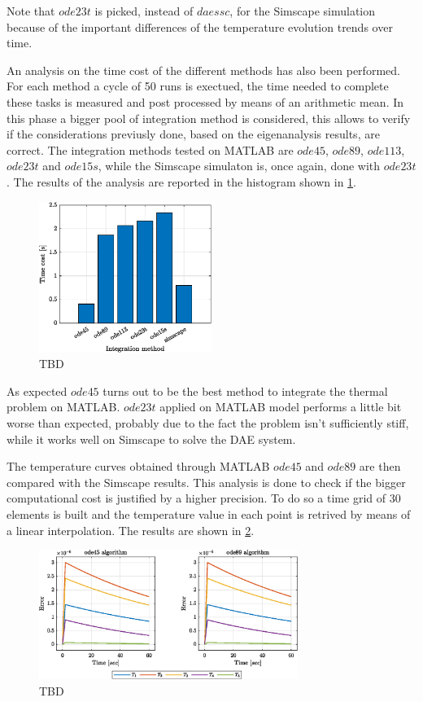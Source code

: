 \documentclass[11pt,a4paper,oneside]{article}
\begin{document}
Note that $ode23t$ is picked, instead of $daessc$, for the Simscape simulation because of the important differences of the temperature evolution trends over time.

An analysis on the time cost of the different methods has also been performed.
For each method a cycle of 50 runs is exectued, the time needed to complete these tasks is measured and post processed by means of an arithmetic mean.
In this phase a bigger pool of integration method is considered, this allows to verify if the considerations previusly done, based on the eigenanalysis results, are correct.
The integration methods tested on MATLAB are $ode45$, $ode89$, $ode113$, $ode23t$ and $ode15s$, while the Simscape simulaton is, once again, done with $ode23t$.
The results of the analysis are reported in the histogram shown in \cref{fig:ex1_CPUtime}.
\begin{figure}[htb]
    \centering
    \includegraphics*[width=0.5\textwidth, keepaspectratio]{Figures/ex1_CPUtime.eps}
    \caption[]{\label{fig:ex1_CPUtime} TBD}
\end{figure}

As expected $ode45$ turns out to be the best method to integrate the thermal problem on MATLAB.
$ode23t$ applied on MATLAB model performs a little bit worse than expected, probably due to the fact the problem isn't sufficiently stiff, while it works well on Simscape to solve the DAE system.

The temperature curves obtained through MATLAB $ode45$ and $ode89$ are then compared with the Simscape results.
This analysis is done to check if the bigger computational cost is justified by a higher precision.
To do so a time grid of 30 elements is built and the temperature value in each point is retrived by means of a linear interpolation.
The results are shown in \cref{fig:ex1_errorCompare}.
\begin{figure}[htb]
    \centering
    \includegraphics*[width=0.75\textwidth, keepaspectratio]{Figures/ex1_errorCompare.eps}
    \caption[]{\label{fig:ex1_errorCompare} TBD}
\end{figure}
\end{document}
